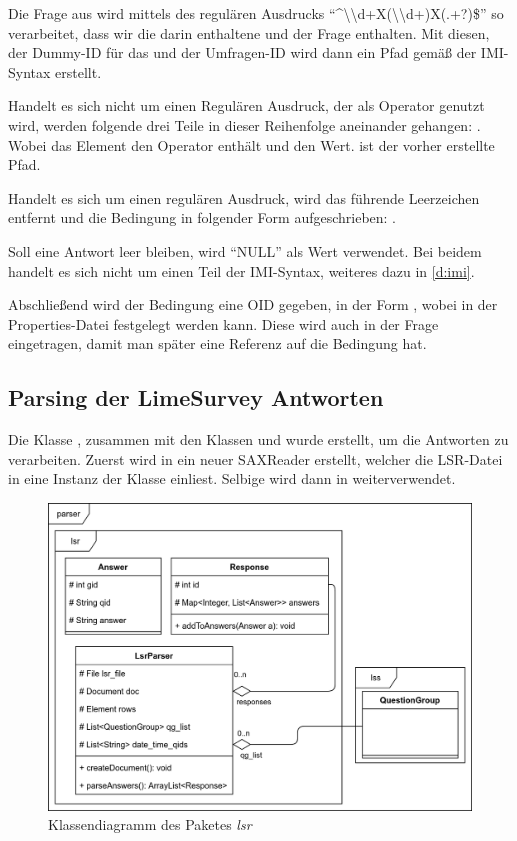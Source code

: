 Die Frage aus  wird mittels des regulären Ausdrucks \enquote{\textasciicircum\textbackslash\textbackslash d+X(\textbackslash\textbackslash d+)X(.+?)\$} so verarbeitet, dass wir die darin enthaltene  und  der Frage enthalten.
Mit diesen, der Dummy-ID für das  und der Umfragen-ID wird dann ein Pfad gemäß der IMI-Syntax erstellt.

Handelt es sich nicht um einen Regulären Ausdruck, der als Operator genutzt wird, werden folgende drei Teile in dieser Reihenfolge aneinander gehangen: .
Wobei das Element  den Operator enthält und  den Wert.  ist der vorher erstellte Pfad.

Handelt es sich um einen regulären Ausdruck, wird das führende Leerzeichen entfernt und die Bedingung in folgender Form aufgeschrieben: .

Soll eine Antwort leer bleiben, wird \enquote{NULL} als Wert verwendet.
Bei beidem handelt es sich nicht um einen Teil der IMI-Syntax, weiteres dazu in \cref{d:imi}.

Abschließend wird der Bedingung eine OID gegeben, in der Form , wobei  in der Properties-Datei festgelegt werden kann.
Diese wird auch in der Frage eingetragen, damit man später eine Referenz auf die Bedingung hat.

\subsection{Parsing der LimeSurvey Antworten}
\label{im:ans}

Die Klasse , zusammen mit den Klassen  und  wurde erstellt, um die Antworten zu verarbeiten.
Zuerst wird in  ein neuer SAXReader erstellt, welcher die LSR-Datei in eine Instanz der Klasse  einliest.
Selbige wird dann in  weiterverwendet.

\begin{figure}[h]
			\centering
			\includegraphics[width=.98\textwidth]{./img/cls_lsr.png}
			\caption{Klassendiagramm des Paketes \textit{lsr}}
\end{figure}

